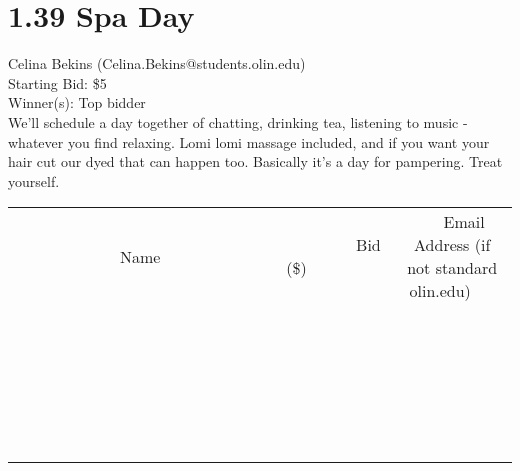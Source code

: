 \documentclass[11pt]{article}
\begin{document}
\section*{1.39 Spa Day}
Celina Bekins (Celina.Bekins@students.olin.edu) \\
Starting Bid: \$5 \\
Winner(s): 
Top bidder \\
We'll schedule a day together of chatting, drinking tea, listening to music - whatever you find relaxing. Lomi lomi massage included, and if you want your hair cut our dyed that can happen too. Basically it's a day for pampering. Treat yourself. \\[6ex]
\begin{tabular}{c c c}
~~~~~~~~~~~~~Name~~~~~~~~~~~~~ & ~~~~~~~~~Bid (\$)~~~~~~~~~ & ~~~Email Address (if not standard olin.edu)~~~ \\
 & & \\
\hline
 & & \\
\hline
 & & \\
\hline
 & & \\
\hline
 & & \\
\hline
 & & \\
\hline
 & & \\
\hline
 & & \\
\hline
 & & \\
\hline
 & & \\
\hline
 & & \\
\hline
 & & \\
\hline
 & & \\
\hline
 & & \\
\hline
 & & \\
\hline
 & & \\
\hline
 & & \\
\hline
 & & \\
\hline
 & & \\
\hline
 & & \\
\hline
 & & \\
\hline
 & & \\
\hline
 & & \\
\hline
 & & \\
\hline
 & & \\
\hline
 & & \\
\hline
\end{tabular}
\clearpage
\end{document}
